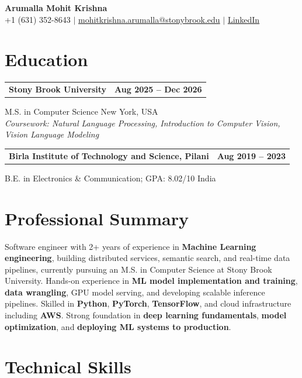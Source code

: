 \documentclass[letterpaper,10pt]{article}
\makeatletter
\newcommand{\entry}[2]{%
  \noindent
  \begin{tabularx}{\linewidth}
    {@{}>{\raggedright\arraybackslash}X@{\hspace{6pt}}r@{}}
    \textbf{#1} & #2
  \end{tabularx}\par
}
\makeatother
\begin{document}
\begin{center}
    {\LARGE\bfseries Arumalla Mohit Krishna}\\[3pt]
    +1 (631) 352-8643 $|$
    \href{mailto:mohitkrishna.arumalla@stonybrook.edu}
    {mohitkrishna.arumalla@stonybrook.edu} $|$
    \href{https://linkedin.com/in/mohit-krishna-arumalla}
    {LinkedIn}
\end{center}
\vspace{-8pt}

\section{Education}

\entry
  {Stony Brook University}
  {\textbf{Aug 2025 -- Dec 2026}}

M.S. in Computer Science \hfill New York, USA\\
\textit{
Coursework: Natural Language Processing,
Introduction to Computer Vision, Vision Language Modeling
}
\vspace{3pt}

\entry
  {Birla Institute of Technology and Science, Pilani}
  {\textbf{Aug 2019 -- 2023}}

B.E. in Electronics \& Communication; GPA: 8.02/10 \hfill India
\section{Professional Summary}

Software engineer with 2+ years of experience in \textbf{Machine Learning engineering}, building distributed services, semantic search, and real-time data pipelines, currently pursuing an M.S. in Computer Science at Stony Brook University. Hands-on experience in \textbf{ML model implementation and training}, \textbf{data wrangling}, GPU model serving, and developing scalable inference pipelines. Skilled in \textbf{Python}, \textbf{PyTorch}, \textbf{TensorFlow}, and cloud infrastructure including \textbf{AWS}. Strong foundation in \textbf{deep learning fundamentals}, \textbf{model optimization}, and \textbf{deploying ML systems to production}.

\section{Technical Skills}
\end{document}
